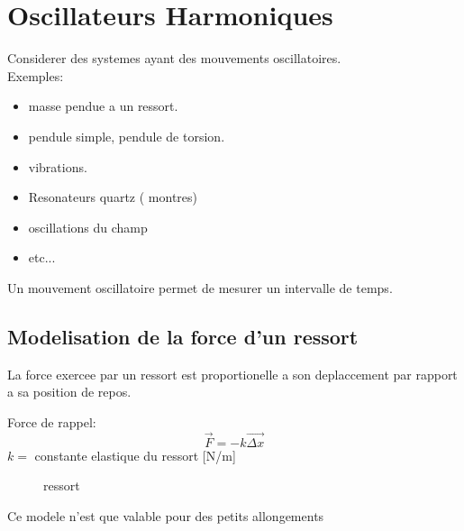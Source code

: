 \documentclass[../main.tex]{subfiles}
\begin{document}
\section{Oscillateurs Harmoniques}
Considerer des systemes ayant des mouvements oscillatoires.\\
Exemples:
\begin{itemize}
	\item masse pendue a un ressort.
	\item pendule simple, pendule de torsion.
	\item vibrations.
	\item Resonateurs quartz ( montres)
	\item oscillations du champ
	\item etc...
\end{itemize}
\begin{rmq}
	Un mouvement oscillatoire permet de mesurer un intervalle de temps.
\end{rmq}
\subsection{Modelisation de la force d'un ressort}
La force exercee par un ressort est proportionelle a son deplaccement par rapport a sa position de repos.

Force de rappel:
\[ 
\vec{F}= - k \vec{\Delta x}
\]
$k=$ constante elastique du ressort  [N/m]
\begin{figure}[H]
    \centering
    \caption{ressort}
    \label{fig:ressort}
\end{figure}
\begin{rmq}
Ce modele n'est que valable pour des petits allongements
\end{rmq}
\end{document}

